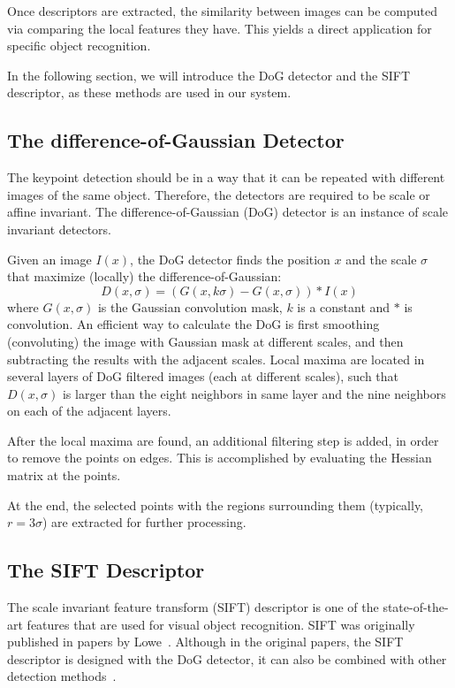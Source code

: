 \documentclass[12pt,final,twoside]{report}
\begin{document}
Once descriptors are extracted, the similarity between images can be computed via comparing the local features they have. This yields a direct application for specific object recognition.

In the following section, we will introduce the DoG detector and the SIFT descriptor, as these methods are used in our system.

\subsection{The difference-of-Gaussian Detector}
The keypoint detection should be in a way that it can be repeated with different images of the same object. Therefore, the detectors are required to be scale or affine invariant. The difference-of-Gaussian (DoG) detector is an instance of scale invariant detectors.

Given an image $I(x)$, the DoG detector finds the position $x$ and the scale $\sigma$ that maximize (locally) the difference-of-Gaussian:
\begin{equation}
  D(x,\sigma) = (G(x,k\sigma) - G(x,\sigma)) * I(x)
\end{equation}
where $G(x,\sigma)$ is the Gaussian convolution mask, $k$ is a constant and $*$ is convolution. An efficient way to calculate the DoG is first smoothing (convoluting) the image with Gaussian mask at different scales, and then subtracting the results with the adjacent scales. Local maxima are located in several layers of DoG filtered images (each at different scales), such that $D(x,\sigma)$ is larger than the eight neighbors in same layer and the nine neighbors on each of the adjacent layers.

After the local maxima are found, an additional filtering step is added, in order to remove the points on edges. This is accomplished by evaluating the Hessian matrix at the points.

At the end, the selected points with the regions surrounding them (typically, $r = 3\sigma$) are extracted for further processing.

\subsection{The SIFT Descriptor}
The scale invariant feature transform (SIFT) descriptor is one of the state-of-the-art features that are used for visual object recognition. SIFT was originally published in papers by Lowe~\cite{lowe_object_1999,lowe_distinctive_2004}. 
Although in the original papers, the SIFT descriptor is designed with the DoG detector, it can also be combined with other detection methods~\cite{mikolajczyk_performance_2005}.
\end{document}
